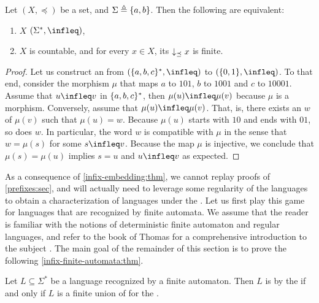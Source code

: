 \begin{corollary}
    \label{infix-embedding-binary:cor}
    Let $(X, \preceq)$ be a  set,
    and $\Sigma \triangleq \{ a,b \}$.
    Then the following are equivalent:
    \begin{enumerate}
        \item \label{infix-embedding-embeds:item} 
            $X$  $(\Sigma^*, \infleq)$,
        \item \label{infix-embedding-count:item}
            $X$ is countable, and for every $x \in X$,
            its 
            $\dwset[\preceq]{x}$ is finite.
    \end{enumerate}
\end{corollary}
\begin{proof}
    Let us construct an  from 
    $(\set{a,b,c}^*, \infleq)$ to $(\set{0,1}, \infleq)$.
    To that end, consider
    the morphism $\mu$ that maps $a$ to $101$, $b$ to $1001$
    and $c$ to $10001$.
    Assume that $u \infleq v$ in $\{ a,b,c \}^*$,
    then $\mu(u) \infleq \mu(v)$ because $\mu$ is a morphism.
    Conversely, assume that $\mu(u) \infleq \mu(v)$.
    That, is, there exists an  $w$ of $\mu(v)$
    such that $\mu(u) = w$.
    Because $\mu(u)$ starts with $10$ and ends with $01$, so does
    $w$. In particular, the word $w$ is compatible with $\mu$
    in the sense that $w = \mu(s)$ for some $s \infleq v$.
    Because the map $\mu$ is injective,
    we conclude that $\mu(s) = \mu(u)$ implies $s = u$
    and $u \infleq v$ as expected.
\end{proof}

As a consequence of \cref{infix-embedding:thm}, we cannot replay proofs of
\cref{prefixes:sec}, and will actually need to leverage some regularity of the
languages to obtain a characterization of  languages
under the . Let us first play this game for languages that
are recognized by finite automata. We assume that the reader is familiar with
the notions of deterministic finite automaton and regular languages, and refer
to the book of Thomas for a comprehensive introduction to the subject
\cite{THOM97}. The main goal of the remainder of this section is to prove the
following \cref{infix-finite-automata:thm}.

\begin{theorem}[restate=infix-finite-automata:thm,label=infix-finite-automata:thm]
    Let $L \subseteq \Sigma^*$ be a language recognized by a finite automaton.
    Then $L$ is  by the  if and only if $L$ is
    a finite union of  for the .
\end{theorem}


